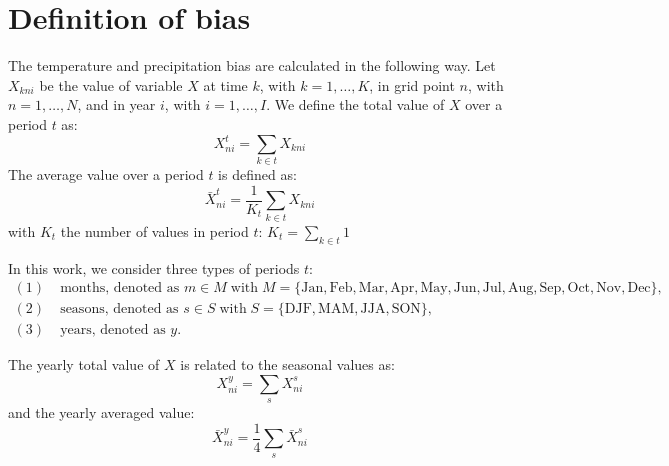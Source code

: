 \documentclass[journal abbreviation, manuscript]{copernicus}
\begin{document}
\appendix

\section{Definition of bias}
\label{sect:bias_definition}

The temperature and precipitation bias are calculated in the following way. Let $X_{kni}$ be the value of variable $X$ at time $k$, with $k = 1, \ldots, K$, in grid point $n$, with $n = 1, \ldots, N$, and in year $i$, with $i = 1, \ldots, I$. We define the total value of $X$ over a period $t$ as:
\begin{equation*}
    X^t_{ni} = \sum_{k \in t} X_{kni}
\end{equation*}
The average value over a period $t$ is defined as:
\begin{equation*}
    \bar{X}^t_{ni} = \frac{1}{K_t} \sum_{k \in t} X_{kni}
\end{equation*}
with $K_t$ the number of values in period $t$: $K_t = \sum_{k \in t} 1$

In this work, we consider three types of periods $t$:
\[
\begin{aligned}
(1)\;& \text{months, denoted as } m \in M \; \text{with} \; M = \{\text{Jan}, \text{Feb}, \text{Mar}, \text{Apr}, \text{May}, \text{Jun}, \text{Jul}, \text{Aug}, \text{Sep}, \text{Oct}, \text{Nov}, \text{Dec}\},\\
(2)\;& \text{seasons, denoted as } s \in S \; \text{with} \; S = \{\text{DJF}, \text{MAM}, \text{JJA}, \text{SON}\},\\
(3)\;& \text{years, denoted as } y .
\end{aligned}
\]

The yearly total value of $X$ is related to the seasonal values as:
\begin{equation*}
    X^y_{ni} = \sum_{s} X^s_{ni}
\end{equation*}
and the yearly averaged value:
\begin{equation*}
    \bar{X}^y_{ni} = \frac{1}{4} \sum_{s} \bar{X}^s_{ni}
\end{equation*}
\end{document}
